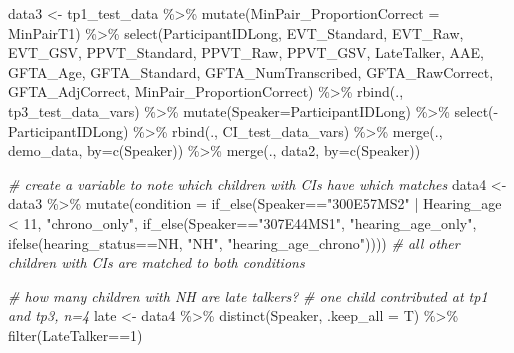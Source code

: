 \documentclass[
]{article}
\newenvironment{Shaded}{\begin{snugshade}}{\end{snugshade}}
\newcommand{\AttributeTok}[1]{\textcolor[rgb]{0.77,0.63,0.00}{#1}}
\newcommand{\CommentTok}[1]{\textcolor[rgb]{0.56,0.35,0.01}{\textit{#1}}}
\newcommand{\DecValTok}[1]{\textcolor[rgb]{0.00,0.00,0.81}{#1}}
\newcommand{\FunctionTok}[1]{\textcolor[rgb]{0.00,0.00,0.00}{#1}}
\newcommand{\NormalTok}[1]{#1}
\newcommand{\OtherTok}[1]{\textcolor[rgb]{0.56,0.35,0.01}{#1}}
\newcommand{\SpecialCharTok}[1]{\textcolor[rgb]{0.00,0.00,0.00}{#1}}
\newcommand{\StringTok}[1]{\textcolor[rgb]{0.31,0.60,0.02}{#1}}
\begin{document}
\begin{Shaded}
\begin{Highlighting}[]
\NormalTok{data3 }\OtherTok{\textless{}{-}}\NormalTok{ tp1\_test\_data }\SpecialCharTok{\%\textgreater{}\%}
  \FunctionTok{mutate}\NormalTok{(}\AttributeTok{MinPair\_ProportionCorrect =}\NormalTok{ MinPairT1) }\SpecialCharTok{\%\textgreater{}\%}
  \FunctionTok{select}\NormalTok{(ParticipantIDLong, EVT\_Standard, }
\NormalTok{         EVT\_Raw, EVT\_GSV, PPVT\_Standard, PPVT\_Raw, }
\NormalTok{         PPVT\_GSV, LateTalker, AAE, }
\NormalTok{         GFTA\_Age, GFTA\_Standard, GFTA\_NumTranscribed,}
\NormalTok{         GFTA\_RawCorrect, GFTA\_AdjCorrect,}
\NormalTok{         MinPair\_ProportionCorrect) }\SpecialCharTok{\%\textgreater{}\%}
  \FunctionTok{rbind}\NormalTok{(., tp3\_test\_data\_vars) }\SpecialCharTok{\%\textgreater{}\%} 
  \FunctionTok{mutate}\NormalTok{(}\AttributeTok{Speaker=}\NormalTok{ParticipantIDLong) }\SpecialCharTok{\%\textgreater{}\%}
  \FunctionTok{select}\NormalTok{(}\SpecialCharTok{{-}}\NormalTok{ParticipantIDLong) }\SpecialCharTok{\%\textgreater{}\%}
  \FunctionTok{rbind}\NormalTok{(., CI\_test\_data\_vars) }\SpecialCharTok{\%\textgreater{}\%}
  \FunctionTok{merge}\NormalTok{(., demo\_data, }\AttributeTok{by=}\FunctionTok{c}\NormalTok{(}\StringTok{\textquotesingle{}Speaker\textquotesingle{}}\NormalTok{)) }\SpecialCharTok{\%\textgreater{}\%}
  \FunctionTok{merge}\NormalTok{(., data2, }\AttributeTok{by=}\FunctionTok{c}\NormalTok{(}\StringTok{\textquotesingle{}Speaker\textquotesingle{}}\NormalTok{))}

\CommentTok{\# create a variable to note which children with CIs have which matches}
\NormalTok{data4 }\OtherTok{\textless{}{-}}\NormalTok{ data3 }\SpecialCharTok{\%\textgreater{}\%}
  \FunctionTok{mutate}\NormalTok{(}\AttributeTok{condition =} \FunctionTok{if\_else}\NormalTok{(Speaker}\SpecialCharTok{==}\StringTok{"300E57MS2"} \SpecialCharTok{|}\NormalTok{ Hearing\_age }\SpecialCharTok{\textless{}} \DecValTok{11}\NormalTok{, }\StringTok{"chrono\_only"}\NormalTok{,}
                             \FunctionTok{if\_else}\NormalTok{(Speaker}\SpecialCharTok{==}\StringTok{"307E44MS1"}\NormalTok{, }\StringTok{"hearing\_age\_only"}\NormalTok{,}
                                     \FunctionTok{ifelse}\NormalTok{(hearing\_status}\SpecialCharTok{==}\StringTok{\textquotesingle{}NH\textquotesingle{}}\NormalTok{, }\StringTok{"NH"}\NormalTok{,}
                                     \StringTok{"hearing\_age\_chrono"}\NormalTok{)))) }\CommentTok{\# all other children with CIs are matched to both conditions}

\CommentTok{\# how many children with NH are late talkers?}
\CommentTok{\# one child contributed at tp1 and tp3, n=4}
\NormalTok{late }\OtherTok{\textless{}{-}}\NormalTok{ data4 }\SpecialCharTok{\%\textgreater{}\%}
  \FunctionTok{distinct}\NormalTok{(Speaker, }\AttributeTok{.keep\_all =}\NormalTok{ T) }\SpecialCharTok{\%\textgreater{}\%}
  \FunctionTok{filter}\NormalTok{(LateTalker}\SpecialCharTok{==}\StringTok{\textquotesingle{}1\textquotesingle{}}\NormalTok{) }


\end{Highlighting}
\end{Shaded}
\end{document}
